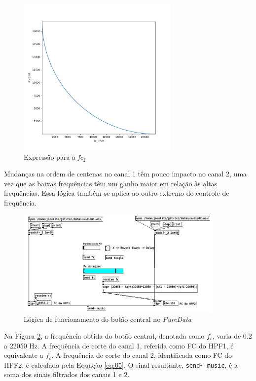 \begin{figure}[h]
    \centering
    \includegraphics[width=0.7\textwidth]{figuras/fig45.png}
    \caption{Expressão para a \textit{fc$_{2}$}}
    \label{fig45}
\end{figure}

Mudanças na ordem de centenas no canal 1 têm pouco impacto no canal 2, uma vez que as baixas frequências têm um ganho maior em relação às altas frequências. Essa lógica também se aplica ao outro extremo do controle de frequência.

\begin{figure}[h]
    \centering
    \includegraphics[width=0.9\textwidth]{figuras/fig44.png}
    \caption{Lógica de funcionamento do botão central no \textit{PureData}}
    \label{fig44}
\end{figure}

Na Figura \ref{fig44}, a frequência obtida do botão central, denotada como \( f_c \), varia de 0.2 a 22050 Hz. A frequência de corte do canal 1, referida como FC do HPF1, é equivalente a \( f_c \). A frequência de corte do canal 2, identificada como FC do HPF2, é calculada pela Equação \ref{eq:05}. O sinal resultante, \texttt{send\textasciitilde\ music}, é a soma dos sinais filtrados dos canais 1 e 2.

